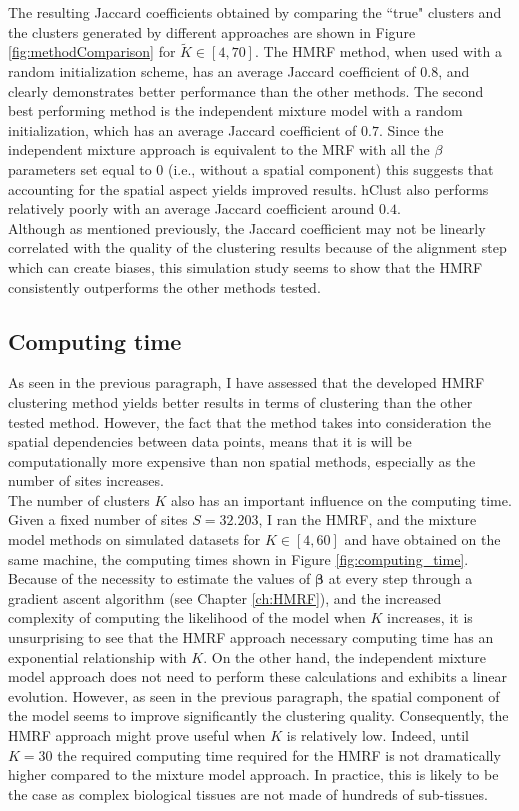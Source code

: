 	The resulting Jaccard coefficients obtained by comparing the ``true" clusters and the clusters generated by different approaches are shown in Figure \ref{fig:methodComparison} for $\tilde{K} \in [4,70]$. The HMRF method, when used with a random initialization scheme, has an average Jaccard coefficient of $0.8$, and clearly demonstrates better performance than the other methods. The second best performing method is the independent mixture model with a random initialization, which has an average Jaccard coefficient of $0.7$. Since the independent mixture approach is equivalent to the MRF with all the $\beta$ parameters set equal to 0 (i.e., without a spatial component) this suggests that accounting for the spatial aspect yields improved results. hClust also performs relatively poorly with an average Jaccard coefficient around $0.4$.\\
	
	Although as mentioned previously, the Jaccard coefficient may not be linearly correlated with the quality of the clustering results because of the alignment step which can create biases, this simulation study seems to show that the HMRF consistently outperforms the other methods tested.
	
	
	\subsection{Computing time}
	As seen in the previous paragraph, I have assessed that the developed HMRF clustering method yields better results in terms of clustering than the other tested method. However, the fact that the method takes into consideration the spatial dependencies between data points, means that it is will be computationally more expensive than non spatial methods, especially as the number of sites increases.\\
	
	The number of clusters $K$ also has an important influence on the computing time. Given a fixed number of sites $S=32.203$, I ran the HMRF, and the mixture model methods on simulated datasets for $K \in [4,60]$ and have obtained on the same machine, the computing times shown in Figure \ref{fig:computing_time}.\\
	
	Because of the necessity to estimate the values of $\boldsymbol{\beta}$ at every step through a gradient ascent algorithm (see Chapter \ref{ch:HMRF}), and the increased complexity of computing the likelihood of the model when $K$ increases, it is unsurprising to see that the HMRF approach necessary computing time has an exponential relationship with $K$. On the other hand, the independent mixture model approach does not need to perform these calculations and exhibits a linear evolution. However, as seen in the previous paragraph, the spatial component of the model seems to improve significantly the clustering quality. Consequently, the HMRF approach might prove useful when $K$ is relatively low. Indeed, until $K=30$ the required computing time required for the HMRF is not dramatically higher compared to the mixture model approach. In practice, this is likely to be the case as complex biological tissues are not made of hundreds of sub-tissues. \\
	
